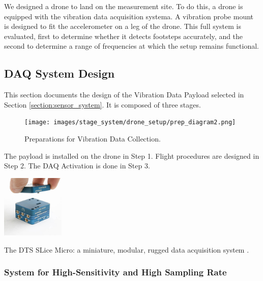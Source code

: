 We designed a drone to land on the measurement site. To do this, a drone is equipped with the vibration data acquisition systema. A vibration probe mount is designed to fit the accelerometer on a leg of the drone. This full system is evaluated, first to determine whether it detects footsteps accurately, and the second to determine a range of frequencies at which the setup remains functional. 




\subsection{DAQ System Design}

This section documents the design of the Vibration Data Payload selected in Section \ref{section:sensor_system}. It is composed of three stages.
            
\begin{figure}[!h]
    \raggedright
    \hspace{1.7cm}
    {\texttt{[image: images/stage\_system/drone\_setup/prep\_diagram2.png]}}
    
    \caption{Preparations for Vibration Data Collection.}
    \label{fig:prep_diagram}
\end{figure}

The payload is installed on the drone in Step 1. Flight procedures are designed in Step 2. The DAQ Activation is done in Step 3.

            \begin{marginfigure}%
              \hspace{0.5cm}
              \includegraphics[width=3cm]{images/stage_system/SLICE-MICRO.jpg}
              \caption{ The DTS SLice Micro: a miniature, modular, rugged data acquisition system \cite{slice_docs}.}
            \end{marginfigure}
  

\subsubsection{System for High-Sensitivity and High Sampling Rate}     

